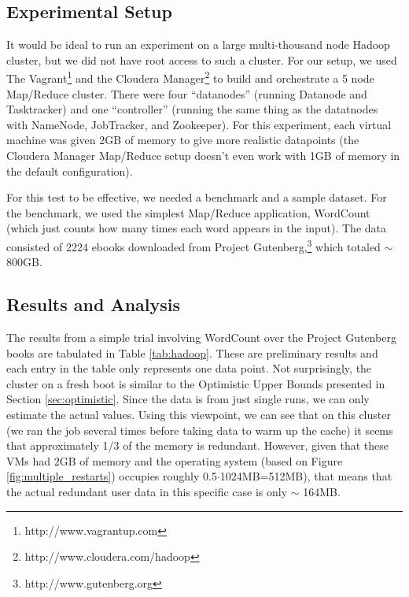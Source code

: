 \documentclass{acm_proc_article-sp}
\begin{document}
\subsection{Experimental Setup}
It would be ideal to run an experiment on a  large multi-thousand node Hadoop cluster, but we did not have root access to such a cluster.  For our setup, we used The Vagrant\footnote{http://www.vagrantup.com} and the Cloudera Manager\footnote{http://www.cloudera.com/hadoop} to build and orchestrate a 5 node Map/Reduce cluster.  There were four ``datanodes'' (running Datanode and Tasktracker) and one ``controller'' (running the same thing as the datatnodes with NameNode, JobTracker, and Zookeeper).  For this experiment, each virtual machine was given 2GB of memory to give more realistic datapoints (the Cloudera Manager Map/Reduce setup doesn't even work with 1GB of memory in the default configuration).

For this test to be effective, we needed a benchmark and a sample dataset.  For the benchmark, we used the simplest Map/Reduce application, WordCount (which just counts how many times each word appears in the input).  The data consisted of 2224 ebooks downloaded from Project Gutenberg,\footnote{http://www.gutenberg.org} which totaled $\sim$ 800GB.

\subsection{Results and Analysis}\label{sec:hadoop_results}
The results from a simple trial involving WordCount over the Project Gutenberg books are tabulated in Table \ref{tab:hadoop}.  These are preliminary results and each entry in the table only represents one data point.  Not surprisingly, the cluster on a fresh boot is similar to the Optimistic Upper Bounds presented in Section \ref{sec:optimistic}.  Since the data is from just single runs, we can only estimate the actual values.  Using this viewpoint, we can see that on this cluster (we ran the job several times before taking data to warm up the cache) it seems that approximately 1/3 of the memory is redundant.  However, given that these VMs had 2GB of memory and the operating system (based on Figure \ref{fig:multiple_restarts}) occupies roughly 0.5$\cdot$1024MB=512MB), that means that the actual redundant user data in this specific case is only $\sim$ 164MB.
\end{document}
